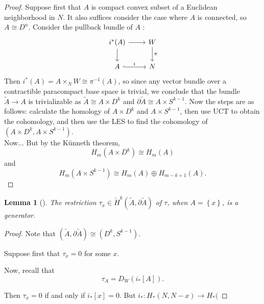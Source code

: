 \documentclass[reqno]{amsart}
\newtheorem{lemma}[theorem]{Lemma}
\theoremstyle{definition}
\theoremstyle{remark}
\begin{document}
\begin{proof}
    Suppose first that
    $A$ is compact convex subset
    of a Euclidean neighborhood in $N$. It also
    suffices consider the case where $A$ is connected,
    so $A \cong D^{n}$.
    Consider the pullback bundle of $A$ :
    \begin{equation*}
    \begin{tikzcd}
        i^{*}(A) \ar[r] \ar[d] & W \ar[d, "\pi"] \\
        A \ar[r, hookrightarrow, "i"] & N
    \end{tikzcd}
    \end{equation*}
    Then
    $i^{*}(A) =
    A \times_{N} W \cong
    \pi^{-1}(A)$, so
    since any vector bundle over a contractible paracompact
    base space is trivial, we conclude that 
    the bundle
    $\tilde{A} \to A$ is trivializable as
    $\tilde{A} \cong A \times D^{k}$ 
    and $\partial \tilde{A} \cong
    A \times S^{k-1}$.
    Now the steps are as follows: calculate
    the homology of 
    $A \times D^{k} $ and
    $A \times S^{k-1} $, then use UCT to obtain
    the cohomology, and then use the LES to find the cohomology
    of
    $\left( A \times D^{k}, A \times S^{k-1} \right) $.\\
    Now...
    But
    by the Künneth theorem,
    \[
    H_m(A \times D^{k}) \cong
    H_m(A)
    \] 
    and
    \[
    H_m(A \times S^{k-1}) \cong
    H_m(A) \oplus H_{m-k+1}(A).
    \] 
\end{proof}


\begin{lemma}[]
    The restriction $\tau_x \in 
    \check{H}^{k}( \tilde{A}, \partial \tilde{A})$ of
    $\tau$, when $A = \left\{ x \right\} $, is a 
    generator.
\end{lemma}

\begin{proof}
    Note that 
    $\left( \tilde{A}, \partial \tilde{A} \right) 
    \cong \left( D^{k}, S^{k-1} \right) $.

    Suppose first that $\tau_x = 0$ for some $x$.

    Now, recall that
    \[
    \tau_{A} = 
    D_W \left( i_* \left[ A \right]  \right) .
    \] 

    Then
    $\tau_x = 0$ if and only if
    $i_* \left[ x \right] = 0$.
    But $i_* \colon 
    H_* \left( N, N - x \right) 
    \to H_* ($



\end{proof}
\end{document}
